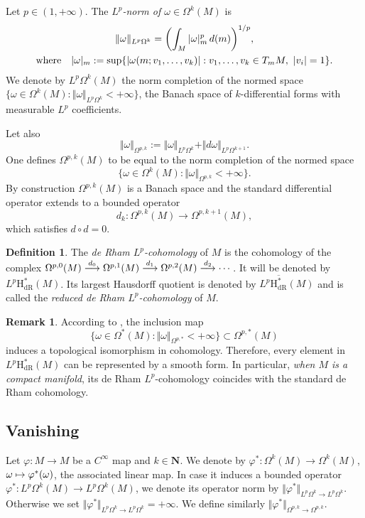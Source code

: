 \documentclass[JEP,XML,SOM,Unicode,published]{cedram}
\newcommand{\NoChangel}[1]{%
\expandafter\let\csname old\string#1\endcsname=#1
\let#1=\relax
\newcommand{#1}{\mathcode`l="716C\csname old\string#1\endcsname\mathcode`l="7160 }%
}
\newcommand\To[1]{\mathchoice{\xrightarrow{\textstyle\kern4pt#1\kern3pt}}{\stackrel{#1}{\longrightarrow}}{}{}}
\newcommand\mto{\mathchoice{\longmapsto}{\mapsto}{\mapsto}{\mapsto}}
\newcommand{\dR}{\mathrm{dR}}
\newcommand{\rH}{\mathrm{H}}
\newcommand{\NN}{\mathbf{N}}
\theoremstyle{plain}
\theoremstyle{remark}
\theoremstyle{definition}
\newtheorem{definition}[equation]{Definition}
\newtheorem{remark}[equation]{Remark}
\DeclareMathOperator{\vol}{vol}\NoChangel{\vol}
\begin{document}
Let $p\in (1, +\infty)$. The \textit{$L^p$\nobreakdash-norm of $\omega \in \Omega^k (M)$} is
\begin{gather*}
\Vert \omega \Vert_{L^p \Omega^k} = \biggl(\int_M \vert \omega \vert_m^p \,d\vol(m)\biggr)^{1/p}, \\
\text{where}\quad\vert \omega \vert_m:= \sup \{ \vert \omega (m; v_1,\dots, v_k) \vert: v_1, \dots, v_k \in T_m M, ~\vert v_i \vert = 1\}.
\end{gather*}
We denote by $L^p \Omega^k (M)$ the norm completion of the normed space $\{\omega \in \Omega^k (M): \Vert \omega \Vert_{L^p \Omega^k} < +\infty \}$,
\ie the Banach space of $k$-differential forms with measurable $L^p$ coefficients.

Let also
\[\Vert \omega \Vert_{\Omega^{p,k}}:= \Vert \omega \Vert_{L^p \Omega^k} + \Vert d\omega \Vert_{L^p \Omega^{k+1}}.\]
One defines $\Omega^{p,k} (M)$ to be equal to the norm completion of the normed space
\[
\{\omega \in \Omega^k (M): \Vert \omega \Vert_{\Omega^{p,k}} < +\infty \}.
\]
By construction $\Omega^{p,k} (M)$ is a Banach space and the standard differential operator extends to a bounded operator
\[d_k: \Omega^{p,k} (M) \to \Omega^{p,k+1} (M),\]
which satisfies $d\circ d =0$.

\begin{definition} The \textit{de Rham $L^p$\nobreakdash-cohomology} of $M$ is the cohomology of the complex $\Omega^{p,0} (M) \To{d_0}
\Omega^{p,1} (M) \To{d_1} \Omega^{p,2} (M) \To{d_2} \cdots $. It will be
denoted by $L^p \rH^*_{\dR} (M)$. Its largest Hausdorff quotient is denoted by
$L^p \overline{\rH^*_{\dR}} (M)$ and is called the \textit{reduced de Rham $L^p$\nobreakdash-cohomology} of $M$.
\end{definition}

\begin{remark} According to \cite[Th.\,12.8]{GT06}, the inclusion map
\[\{\omega \in \Omega^* (M): \Vert \omega \Vert_{\Omega^{p,*}} < +\infty \} \subset \Omega^{p, *}(M)\] induces a
topological isomorphism in cohomology. Therefore, every element in $L^p \rH^*_{\dR} (M)$ can be represented by a smooth form.
In particular, \textit{when $M$ is a compact manifold}, its de Rham $L^p$\nobreakdash-cohomology coincides with the standard de Rham cohomology.
\end{remark}

\subsection{Vanishing} Let $\varphi: M \to M$ be a $C^\infty$ map and $k \in \NN$.
We denote by $\varphi^*: \Omega^k (M) \to \Omega^k (M)$, $\omega \mto \varphi^* (\omega)$,
the associated linear map. In case it induces a bounded operator $\varphi^*: L^p \Omega^k (M) \to L^p \Omega^k (M)$,
we denote its operator
norm by $\Vert \varphi^* \Vert_{L^p \Omega^k \to L^p \Omega^k}$.
Otherwise we set $\Vert \varphi^* \Vert_{L^p \Omega^k \to L^p \Omega^k} = +\infty$.
We define similarly $\Vert \varphi^* \Vert_{\Omega^{p,k} \to \Omega^{p,k}}$.
\end{document}
